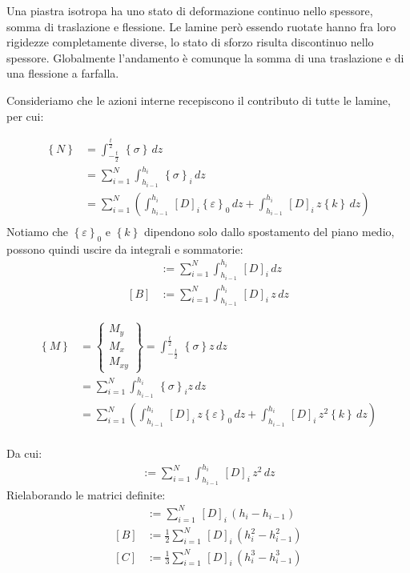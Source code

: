 Una piastra isotropa ha uno stato di deformazione continuo nello spessore, somma di traslazione e flessione. Le lamine però essendo ruotate hanno fra loro rigidezze completamente diverse, lo stato di sforzo risulta discontinuo nello spessore. Globalmente l'andamento è comunque la somma di una traslazione e di una flessione a farfalla.

Consideriamo che le azioni interne recepiscono il contributo di tutte le lamine, per cui:

\begin{align*}
    \left\{N\right\} &= \int_{-\frac{t}{2}}^{\frac{t}{2}}\,  \left\{\sigma\right\} \,dz\\
    &= \sum^N_{i=1}\int_{h_{i-1}}^{h_i}\,  \left\{\sigma\right\}_i \,dz\\
     &= \sum^N_{i=1}\left(\int_{h_{i-1}}^{h_i}\, [D]_i \left\{\varepsilon\right\}_0 \,dz       
     +\int_{h_{i-1}}^{h_i}\, [D]_i \,z\left\{k\right\} \,dz           \right)\\
\end{align*}
Notiamo che $ \left\{\varepsilon\right\}_0$ e $\left\{k\right\}  $ dipendono solo dallo spostamento del piano medio, possono quindi uscire da integrali e sommatorie:
\begin{align*}
    [A] &:= \sum^N_{i=1}\int_{h_{i-1}}^{h_i}\,  [D]_i \,dz\\
      [B] &:= \sum^N_{i=1}\int_{h_{i-1}}^{h_i}\,  [D]_i\,z \,dz
\end{align*}

\begin{align*}
    \left\{M\right\} &= \begin{Bmatrix}
        M_y\\M_x\\M_{xy}
    \end{Bmatrix} =\int_{-\frac{t}{2}}^{\frac{t}{2}}\,  \left\{\sigma\right\} z\,dz\\
    &= \sum^N_{i=1}\int_{h_{i-1}}^{h_i}\,  \left\{\sigma\right\}_i z\,dz\\
     &= \sum^N_{i=1}\left(\int_{h_{i-1}}^{h_i}\, [D]_i \,z\left\{\varepsilon\right\}_0 \,dz       
     +\int_{h_{i-1}}^{h_i}\, [D]_i \,z^2\left\{k\right\} \,dz           \right)\\
\end{align*}

Da cui:
\begin{align*}
      [C] := \sum^N_{i=1}\int_{h_{i-1}}^{h_i}\,  [D]_i\,z^2 \,dz
\end{align*}
Rielaborando le matrici definite:
\begin{align*}
    [A] &:= \sum^N_{i=1}\,  [D]_i \,(h_i-h_{i-1})\\
      [B] &:= \frac{1}{2}\sum^N_{i=1}\,  [D]_i \,(h_i^2-h_{i-1}^2)\\
       [C] &:=\frac{1}{3} \sum^N_{i=1}\,  [D]_i \,(h_i^3-h_{i-1}^3)\\
\end{align*}

